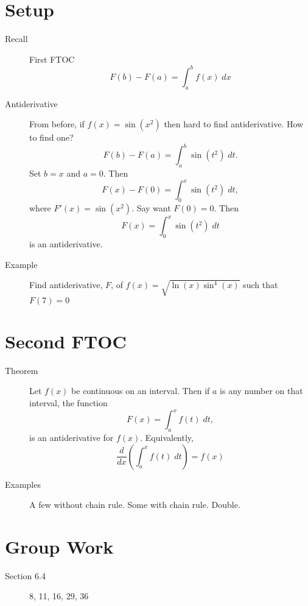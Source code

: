 \documentclass[11pt]{article}
\begin{document}
\drawtitle

\section*{Setup}
\begin{description}
\item[Recall] First FTOC
  \[
  F(b)-F(a)=\int_a^b f(x)\;dx
  \]
\item[Antiderivative] From before, if $f(x)=\sin(x^2)$ then hard to
  find antiderivative.  How to find one?
  \[
  F(b)-F(a)=\int_a^b \sin(t^2)\;dt.
  \]
  Set $b=x$ and $a=0$.  Then
  \[
  F(x)-F(0)=\int_0^x \sin(t^2)\;dt,
  \]
  where $F'(x)=\sin(x^2)$.  Say want $F(0)=0$.  Then
  \[
  F(x)=\int_0^x \sin(t^2)\;dt
  \]
  is an antiderivative.

\item[Example] Find antiderivative, $F$, of
  $f(x)=\sqrt{\ln(x)\sin^4(x)}$ such that $F(7)=0$

\end{description}

\section*{Second FTOC}
\begin{description}
\item[Theorem] Let $f(x)$ be continuous on an interval.  Then if $a$
  is any number on that interval, the function
  \[
  F(x)=\int_a^x f(t)\;dt,
  \]
  is an antiderivative for $f(x)$.  Equivalently,
  \[
  \frac{d}{dx}\left(\int_a^x f(t)\;dt\right)=f(x)
  \]
\item[Examples] A few without chain rule.  Some with chain rule.
  Double.


\end{description}

\section*{Group Work}
\begin{description}
\item[Section 6.4] 8, 11, 16, 29, 36
\end{description}
\end{document}

